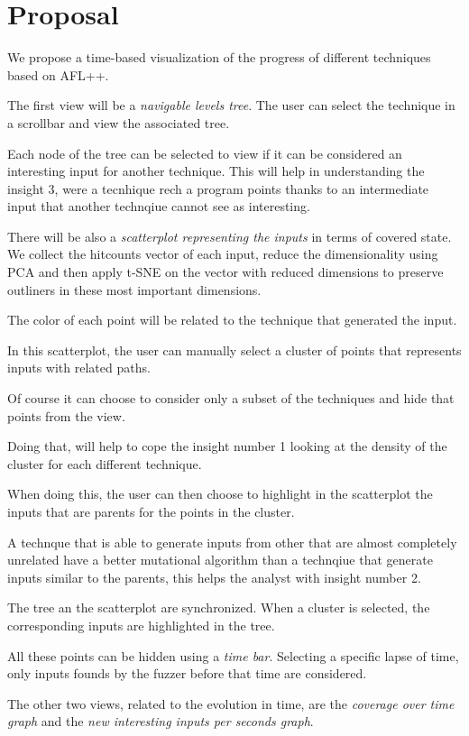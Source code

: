 \documentclass[conference,compsoc]{IEEEtran}
\begin{document}
\iffalse
\section{Proposal}

We propose a time-based visualization of the progress of different techniques based on {\sc AFL++}.

The first view will be a {\em navigable levels tree}. The user can select the technique in a scrollbar and view the associated tree.

Each node of the tree can be selected to view if it can be considered an interesting input for another technique. This will help in understanding the insight 3, were a tecnhique rech a program points thanks to an intermediate input that another technqiue cannot see as interesting.

There will be also a {\em scatterplot representing the inputs} in terms of covered state.
We collect the hitcounts vector of each input, reduce the dimensionality using PCA and then apply t-SNE on the vector with reduced dimensions to preserve outliners in these most important dimensions.

The color of each point will be related to the technique that generated the input.

In this scatterplot, the user can manually select a cluster of points that represents inputs with related paths.

Of course it can choose to consider only a subset of the techniques and hide that points from the view.

Doing that, will help to cope the insight number 1 looking at the density of the cluster for each different technique.

When doing this, the user can then choose to highlight in the scatterplot the inputs that are parents for the points in the cluster.

A technque that is able to generate inputs from other that are almost completely unrelated have a better mutational algorithm than a technqiue that generate inputs similar to the parents, this helps the analyst with insight number 2.

The tree an the scatterplot are synchronized. When a cluster is selected, the corresponding inputs are highlighted in the tree.

All these points can be hidden using a {\em time bar}. Selecting a specific lapse of time, only inputs founds by the fuzzer before that time are considered.

The other two views, related to the evolution in time, are the {\em coverage over time graph} and the {\em new interesting inputs per seconds graph}.
\end{document}

